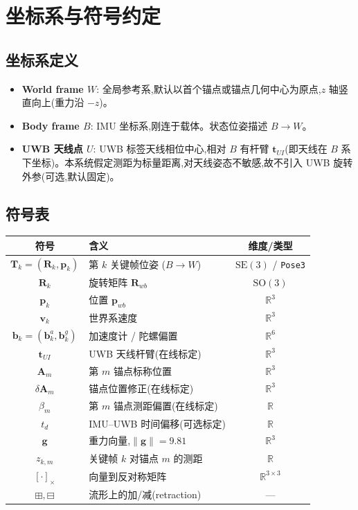 \documentclass[11pt,a4paper]{report}
\newcommand{\R}{\mathbb{R}}
\newcommand{\SO}{\mathrm{SO}(3)}
\newcommand{\SE}{\mathrm{SE}(3)}
\newcommand{\bp}{\bm{p}}
\newcommand{\bv}{\bm{v}}
\newcommand{\bb}{\bm{b}}
\newcommand{\bg}{\bm{g}}
\newcommand{\bR}{\bm{R}}
\newcommand{\bT}{\bm{T}}
\newcommand{\bA}{\bm{A}}
\newcommand{\bt}{\bm{t}}
\newcommand{\skewop}[1]{\left[#1\right]_{\times}}
\begin{document}
\chapter{坐标系与符号约定}

\section{坐标系定义}
\begin{itemize}[leftmargin=2em]
  \item \textbf{World frame $W$}: 全局参考系,默认以首个锚点或锚点几何中心为原点,$z$ 轴竖直向上(重力沿 $-z$)。
  \item \textbf{Body frame $B$}: IMU 坐标系,刚连于载体。状态位姿描述 $B\to W$。
  \item \textbf{UWB 天线点 $U$}: UWB 标签天线相位中心,相对 $B$ 有杆臂 $\bt_{UI}$(即天线在 $B$ 系下坐标)。本系统假定测距为标量距离,对天线姿态不敏感,故不引入 UWB 旋转外参(可选,默认固定)。
\end{itemize}

\section{符号表}
\begin{longtable}{c p{5.2cm} c}
\toprule
符号 & 含义 & 维度/类型 \\
\midrule
$\bT_k=(\bR_k,\bp_k)$ & 第 $k$ 关键帧位姿 ($B\to W$) & $\SE$ / \texttt{Pose3} \\
$\bR_k$ & 旋转矩阵 $\bR_{wb}$ & $\SO$ \\
$\bp_k$ & 位置 $\bp_{wb}$ & $\R^3$ \\
$\bv_k$ & 世界系速度 & $\R^3$ \\
$\bb_k=(\bb_k^a,\bb_k^g)$ & 加速度计 / 陀螺偏置 & $\R^6$ \\
$\bt_{UI}$ & UWB 天线杆臂(在线标定) & $\R^3$ \\
$\bA_m$ & 第 $m$ 锚点标称位置 & $\R^3$ \\
$\delta\bA_m$ & 锚点位置修正(在线标定) & $\R^3$ \\
$\beta_m$ & 第 $m$ 锚点测距偏置(在线标定) & $\R$ \\
$t_d$ & IMU--UWB 时间偏移(可选标定) & $\R$ \\
$\bg$ & 重力向量,$\|\bg\|=9.81$ & $\R^3$ \\
$z_{k,m}$ & 关键帧 $k$ 对锚点 $m$ 的测距 & $\R$ \\
$\skewop{\cdot}$ & 向量到反对称矩阵 & $\R^{3\times3}$ \\
$\boxplus,\boxminus$ & 流形上的加/减(retraction) & --- \\
\bottomrule
\end{longtable}
\end{document}
